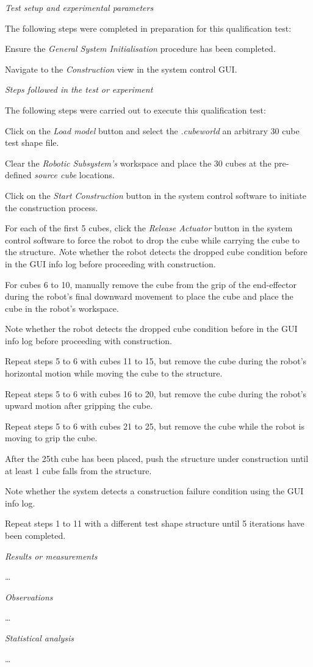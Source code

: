 \textit{Test setup and experimental parameters}

The following steps were completed in preparation for this qualification test:

\begin{compactenum}
	\item Ensure the \textit{General System Initialisation} procedure has been completed.
	\item Navigate to the \textit{Construction} view in the system control GUI.
\end{compactenum}

\textit{Steps followed in the test or experiment}

The following steps were carried out to execute this qualification test:

\begin{compactenum}
	\item Click on the \textit{Load model} button and select the \textit{.cubeworld} an arbitrary 30 cube test shape file.
	\item Clear the \textit{Robotic Subsystem's} workspace and place the 30 cubes at the pre-defined \textit{source cube} locations.
	\item Click on the \textit{Start Construction} button in the system control software to initiate the construction process.
	\item For each of the first 5 cubes, click the \textit{Release Actuator} button in the system control software to force the robot to drop the cube while carrying the cube to the structure.
	\textit Note whether the robot detects the dropped cube condition before in the GUI info log before proceeding with construction.
	\item For cubes 6 to 10, manually remove the cube from the grip of the end-effector during the robot's final downward movement to place the cube and place the cube in the robot's workspace.
	\item Note whether the robot detects the dropped cube condition before in the GUI info log before proceeding with construction.
	\item Repeat steps 5 to 6 with cubes 11 to 15, but remove the cube during the robot's horizontal motion while moving the cube to the structure.
	\item Repeat steps 5 to 6 with cubes 16 to 20, but remove the cube during the robot's upward motion after gripping the cube.
	\item Repeat steps 5 to 6 with cubes 21 to 25, but remove the cube while the robot is moving to grip the cube.
	\item After the 25th cube has been placed, push the structure under construction until at least 1 cube falls from the structure.
	\item Note whether the system detects a construction failure condition using the GUI info log.
	\item Repeat steps 1 to 11 with a different test shape structure until 5 iterations have been completed.
\end{compactenum}

\textit{Results or measurements}

\ldots

\textit{Observations}

\ldots

\textit{Statistical analysis}

\ldots

\newpage



